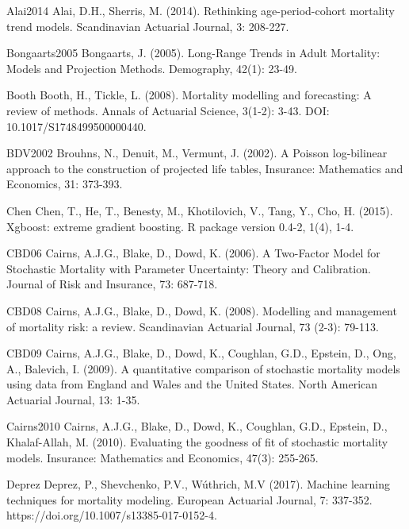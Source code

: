 \documentclass[fleqn,10pt]{wlscirep}
\begin{document}
%
\begin{thebibliography}{99}

\bibitem%
{Alai2014}
Alai, D.H., Sherris, M. (2014). Rethinking age-period-cohort mortality trend models. Scandinavian Actuarial Journal, 3: 208-227.

\bibitem%
{Bongaarts2005}
Bongaarts, J. (2005). Long-Range Trends in Adult Mortality: Models and Projection Methods. Demography, 42(1): 23-49.

\bibitem%
{Booth}
Booth, H., Tickle, L. (2008). Mortality modelling and forecasting: A review of methods. Annals of Actuarial Science, 3(1-2): 3-43. DOI: 10.1017/S1748499500000440.

\bibitem%
{BDV2002}
Brouhns, N., Denuit, M., Vermunt, J. (2002). A Poisson log-bilinear approach to the construction of projected life tables, Insurance: Mathematics and Economics, 31: 373-393.

\bibitem%
{Chen} 
Chen, T., He, T., Benesty, M., Khotilovich, V., Tang, Y., Cho, H. (2015). Xgboost: extreme gradient boosting. R package version 0.4-2, 1(4), 1-4.

\bibitem%
{CBD06} 
Cairns, A.J.G., Blake, D., Dowd, K. (2006). A Two-Factor Model for Stochastic Mortality with Parameter Uncertainty: Theory and Calibration. Journal of Risk and Insurance, 73: 687-718.

\bibitem%
{CBD08} 
Cairns, A.J.G., Blake, D., Dowd, K. (2008). Modelling and management of mortality risk: a review. Scandinavian Actuarial Journal, 73 (2-3): 79-113.

\bibitem%
{CBD09} 
Cairns, A.J.G., Blake, D., Dowd, K., Coughlan, G.D., Epstein, D., Ong, A., Balevich, I. (2009). A quantitative comparison of stochastic mortality models using data from England and Wales and the United States. North American Actuarial Journal, 13: 1-35.

\bibitem%
{Cairns2010}
Cairns, A.J.G., Blake, D., Dowd, K., Coughlan, G.D., Epstein, D., Khalaf-Allah, M. (2010). Evaluating the goodness of fit of stochastic mortality models. Insurance: Mathematics and Economics, 47(3): 255-265.

\bibitem%
{Deprez} 
Deprez, P., Shevchenko, P.V., W\'uthrich, M.V (2017). Machine learning techniques for mortality modeling. European Actuarial Journal, 7: 337-352. https://doi.org/10.1007/s13385-017-0152-4.


\end{thebibliography}
\end{document}
